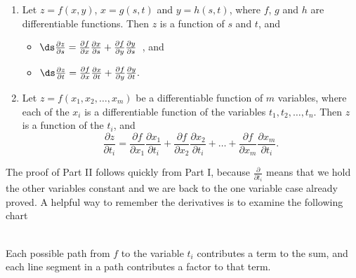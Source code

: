 \begin{theorem}\label{thm:multi_chain2}
%
\begin{enumerate}
	\item Let $z=f(x,y)$, $x=g(s,t)$ and $y=h(s,t)$, where $f$, $g$ and $h$ are differentiable functions. Then $z$ is a function of $s$ and $t$, and
	\begin{itemize}
		\item $\ds \frac{\partial z}{\partial s} = \frac{\partial f}{\partial x}\frac{\partial x}{\partial s} + \frac{\partial f}{\partial y}\frac{\partial y}{\partial s}$\ , \quad and 
		\item $\ds \frac{\partial z}{\partial t} = \frac{\partial f}{\partial x}\frac{\partial x}{\partial t} + \frac{\partial f}{\partial y}\frac{\partial y}{\partial t}.$
	\end{itemize}
		
	\item Let $z = f(x_1,x_2,\dots,x_m)$ be a differentiable function of $m$ variables, where each of the $x_i$ is a differentiable function of the variables $t_1,t_2,\dots,t_n$. Then $z$ is a function of the $t_i$, and 
	\[\frac{\partial z}{\partial t_i} = \frac{\partial f}{\partial x_1}\frac{\partial x_1}{\partial t_i} + \frac{\partial f}{\partial x_2}\frac{\partial x_2}{\partial t_i} + \dots +  \frac{\partial f}{\partial x_m}\frac{\partial x_m}{\partial t_i}.\]
\end{enumerate}
\end{theorem}

The proof of Part II follows quickly from Part I, because $\frac\partial{\partial t_i}$ means that we hold the other variables constant and we are back to the one variable case already proved.  A helpful way to remember the derivatives is to examine the following chart\\
\noindent\begin{minipage}[t]{\linewidth}\noindent%
\captionsetup{type=figure}%
\centering
{}
\end{minipage}\\
Each possible path from $f$ to the variable $t_i$ contributes a term to the sum, and each line segment in a path contributes a factor to that term.

